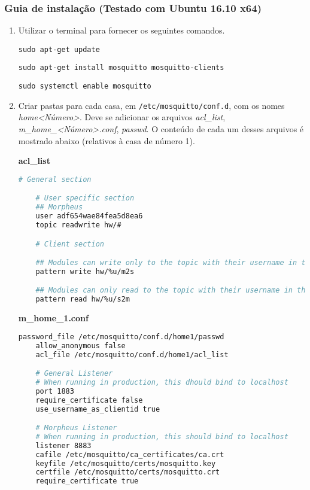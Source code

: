 \subsubsection{Guia de instalação (Testado com Ubuntu 16.10 x64)}\label{sec:arquivosCriados}
\begin{enumerate}
\item Utilizar o terminal para fornecer os seguintes comandos.

\lstinline{sudo apt-get update}

\lstinline{sudo apt-get install mosquitto mosquitto-clients}

\lstinline{sudo systemctl enable mosquitto}

\item Criar pastas para cada casa, em \lstinline{/etc/mosquitto/conf.d}, com os nomes \emph{home\textless Número\textgreater }. Deve se adicionar os arquivos \emph{acl\_list}, \emph{m\_home\_\textless Número\textgreater .conf}, \emph{passwd}. O conteúdo de cada um desses arquivos é mostrado abaixo (relativos à casa de número 1).


\textbf{acl\_list}

\begin{lstlisting}[language=bash]
    # General section

    # User specific section
    ## Morpheus
    user adf654wae84fea5d8ea6
    topic readwrite hw/#

    # Client section

    ## Modules can write only to the topic with their username in the m2s version
    pattern write hw/%u/m2s

    ## Modules can only read to the topic with their username in the s2m version
    pattern read hw/%u/s2m
\end{lstlisting}

\textbf{m\_home\_1.conf}

\begin{lstlisting}[language=bash]
    password_file /etc/mosquitto/conf.d/home1/passwd
    allow_anonymous false
    acl_file /etc/mosquitto/conf.d/home1/acl_list

    # General Listener
    # When running in production, this dhould bind to localhost
    port 1883
    require_certificate false
    use_username_as_clientid true

    # Morpheus Listener
    # When running in production, this should bind to localhost
    listener 8883
    cafile /etc/mosquitto/ca_certificates/ca.crt
    keyfile /etc/mosquitto/certs/mosquitto.key
    certfile /etc/mosquitto/certs/mosquitto.crt
    require_certificate true
\end{lstlisting}


\end{enumerate}
